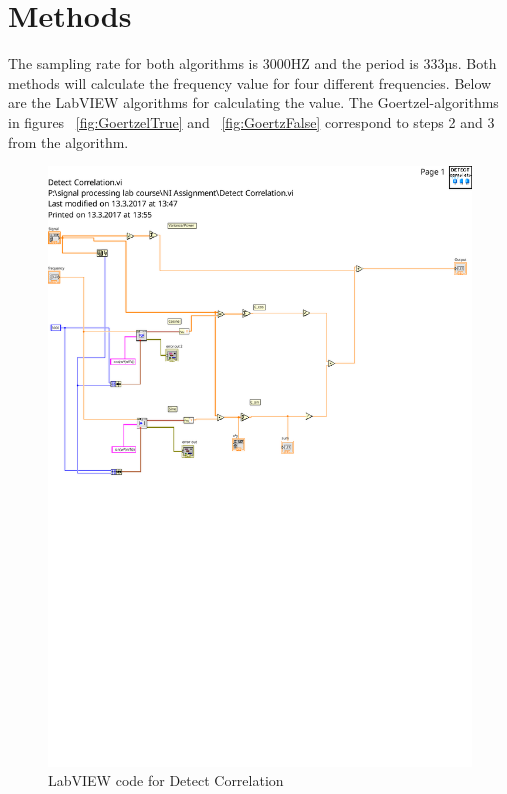 \section{Methods}
The sampling rate for both algorithms is 3000HZ and the period is 333µs. Both methods will calculate the frequency value for four different frequencies. Below are the LabVIEW algorithms for calculating the value. The Goertzel-algorithms in figures ~\ref{fig:GoertzelTrue} and ~\ref{fig:GoertzFalse} correspond to steps 2 and 3 from the algorithm.
\begin{figure}[H]
  \centering
  \includegraphics[width=0.8\linewidth]{detect_freq}
  \caption{LabVIEW code for Detect Correlation}
\label{fig:correlation}
\end{figure}


